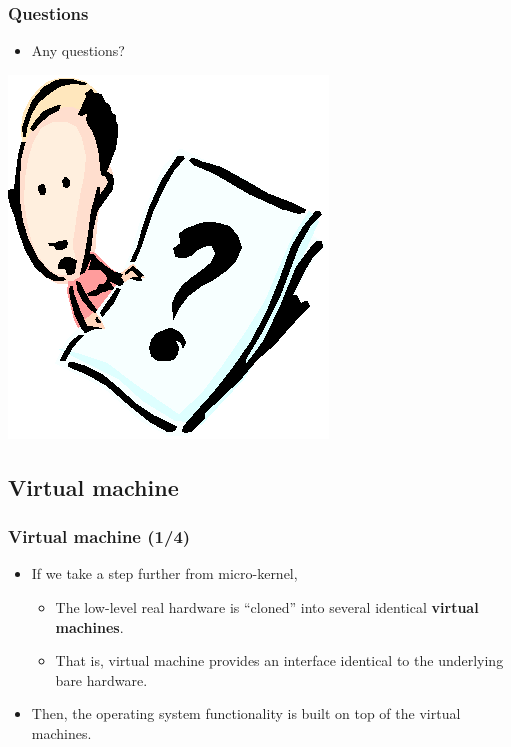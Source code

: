 \documentclass[CJKutf8,xcolor=pdftex,dvipsnames,table]{beamer}
\begin{document}
\begin{CJK*}{UTF8}{song}
  \begin{frame}
    \frametitle{Questions}
    \begin{itemize}
    \item{Any questions?}
    \end{itemize}
    \begin{center}
      \includegraphics[scale=.5]{question}
    \end{center}
  \end{frame}
  
  \subsection{Virtual machine}

  \begin{frame}
    \frametitle{Virtual machine (1/4)} \pause
    \begin{itemize}
    \item{If we take a step further from micro-kernel,} \pause
      \begin{itemize}
      \item{The low-level real hardware is ``cloned'' into several identical \textbf{virtual machines}.} \pause
      \item{That is, virtual machine provides an interface identical to the underlying bare hardware.} \pause
      \end{itemize}
    \item{Then, the operating system functionality is built on top of the virtual machines.}
    \end{itemize}
  \end{frame}
  

\end{CJK*}
\end{document}
